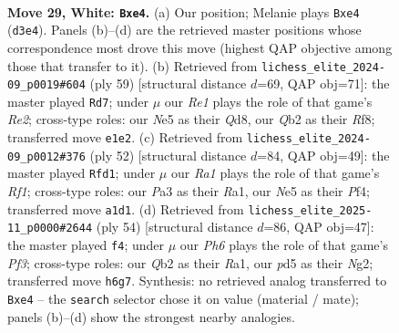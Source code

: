 \documentclass[11pt]{article}
\begin{document}
\clearpage

\begin{figure}[p]\centering
\begin{subfigure}{0.46\textwidth}\centering
\resizebox{\linewidth}{!}{%
\newchessgame
\chessboard[
  setfen={r3b1k1/pr3pp1/7P/p2pN3/4n2q/PP1B4/1Q3P2/R3R1K1 w - - 0 29},
  showmover=false,
  pgfstyle=straightmove, color=movearrow, markmove={d3-e4}
]}
\caption{}
\end{subfigure}\hfill
\begin{subfigure}{0.46\textwidth}\centering
\resizebox{\linewidth}{!}{%
\newchessgame
\chessboard[
  setfen={3q1r1k/4r2p/2p2p2/ppR1PP2/3n3Q/P2P3B/7P/5R1K b - - 2 30},
  showmover=false,
  pgfstyle=straightmove, color=movearrow, markmove={e7-d7}
]}
\caption{}
\end{subfigure}
\\[4pt]
\begin{subfigure}{0.46\textwidth}\centering
\resizebox{\linewidth}{!}{%
\newchessgame
\chessboard[
  setfen={3r3k/p1rn1p1p/1p6/3qPB1p/5P2/4QP2/8/R4RK1 w - - 1 27},
  showmover=false,
  pgfstyle=straightmove, color=movearrow, markmove={f1-d1}
]}
\caption{}
\end{subfigure}\hfill
\begin{subfigure}{0.46\textwidth}\centering
\resizebox{\linewidth}{!}{%
\newchessgame
\chessboard[
  setfen={5r1k/3q2pp/8/1p3Pnr/2nP3B/2PQ1P2/6NP/R4R1K w - - 1 28},
  showmover=false,
  pgfstyle=straightmove, color=movearrow, markmove={f3-f4}
]}
\caption{}
\end{subfigure}
\caption{\textbf{Move 29, White: \texttt{Bxe4}.} (a) Our position; Melanie plays \texttt{Bxe4} (\texttt{d3e4}). Panels (b)--(d) are the retrieved master positions whose correspondence most drove this move (highest QAP objective among those that transfer to it). (b) Retrieved from \texttt{lichess\_elite\_2024-09\_p0019\#604} (ply 59) [structural distance $d$=69, QAP obj=71]: the master played \texttt{Rd7}; under $\mu$ our \emph{Re1} plays the role of that game's \emph{Re2}; cross-type roles: our \emph{N}e5 as their \emph{Q}d8, our \emph{Q}b2 as their \emph{R}f8; transferred move \texttt{e1e2}. (c) Retrieved from \texttt{lichess\_elite\_2024-09\_p0012\#376} (ply 52) [structural distance $d$=84, QAP obj=49]: the master played \texttt{Rfd1}; under $\mu$ our \emph{Ra1} plays the role of that game's \emph{Rf1}; cross-type roles: our \emph{P}a3 as their \emph{R}a1, our \emph{N}e5 as their \emph{P}f4; transferred move \texttt{a1d1}. (d) Retrieved from \texttt{lichess\_elite\_2025-11\_p0000\#2644} (ply 54) [structural distance $d$=86, QAP obj=47]: the master played \texttt{f4}; under $\mu$ our \emph{Ph6} plays the role of that game's \emph{Pf3}; cross-type roles: our \emph{Q}b2 as their \emph{R}a1, our \emph{p}d5 as their \emph{N}g2; transferred move \texttt{h6g7}. Synthesis: no retrieved analog transferred to \texttt{Bxe4} -- the \texttt{search} selector chose it on value (material / mate); panels (b)--(d) show the strongest nearby analogies.}
\label{fig:thought-m56}
\end{figure}
\end{document}
